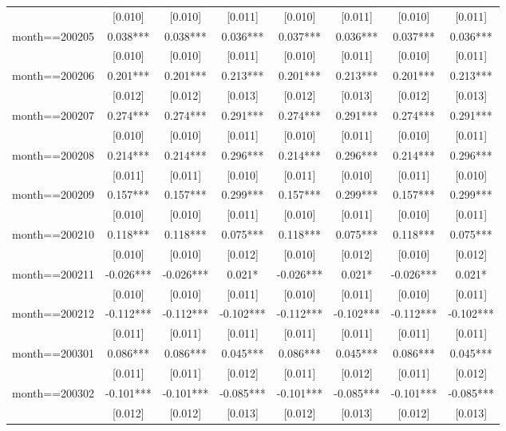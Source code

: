 \documentclass[]{article}
\begin{document}
\begin{tabular}{lccccccc}
 & [0.010] & [0.010] & [0.011] & [0.010] & [0.011] & [0.010] & [0.011] \\
month==200205 & 0.038*** & 0.038*** & 0.036*** & 0.037*** & 0.036*** & 0.037*** & 0.036*** \\
 & [0.010] & [0.010] & [0.011] & [0.010] & [0.011] & [0.010] & [0.011] \\
month==200206 & 0.201*** & 0.201*** & 0.213*** & 0.201*** & 0.213*** & 0.201*** & 0.213*** \\
 & [0.012] & [0.012] & [0.013] & [0.012] & [0.013] & [0.012] & [0.013] \\
month==200207 & 0.274*** & 0.274*** & 0.291*** & 0.274*** & 0.291*** & 0.274*** & 0.291*** \\
 & [0.010] & [0.010] & [0.011] & [0.010] & [0.011] & [0.010] & [0.011] \\
month==200208 & 0.214*** & 0.214*** & 0.296*** & 0.214*** & 0.296*** & 0.214*** & 0.296*** \\
 & [0.011] & [0.011] & [0.010] & [0.011] & [0.010] & [0.011] & [0.010] \\
month==200209 & 0.157*** & 0.157*** & 0.299*** & 0.157*** & 0.299*** & 0.157*** & 0.299*** \\
 & [0.010] & [0.010] & [0.011] & [0.010] & [0.011] & [0.010] & [0.011] \\
month==200210 & 0.118*** & 0.118*** & 0.075*** & 0.118*** & 0.075*** & 0.118*** & 0.075*** \\
 & [0.010] & [0.010] & [0.012] & [0.010] & [0.012] & [0.010] & [0.012] \\
month==200211 & -0.026*** & -0.026*** & 0.021* & -0.026*** & 0.021* & -0.026*** & 0.021* \\
 & [0.010] & [0.010] & [0.011] & [0.010] & [0.011] & [0.010] & [0.011] \\
month==200212 & -0.112*** & -0.112*** & -0.102*** & -0.112*** & -0.102*** & -0.112*** & -0.102*** \\
 & [0.011] & [0.011] & [0.011] & [0.011] & [0.011] & [0.011] & [0.011] \\
month==200301 & 0.086*** & 0.086*** & 0.045*** & 0.086*** & 0.045*** & 0.086*** & 0.045*** \\
 & [0.011] & [0.011] & [0.012] & [0.011] & [0.012] & [0.011] & [0.012] \\
month==200302 & -0.101*** & -0.101*** & -0.085*** & -0.101*** & -0.085*** & -0.101*** & -0.085*** \\
 & [0.012] & [0.012] & [0.013] & [0.012] & [0.013] & [0.012] & [0.013] \\

\end{tabular}
\end{document}
